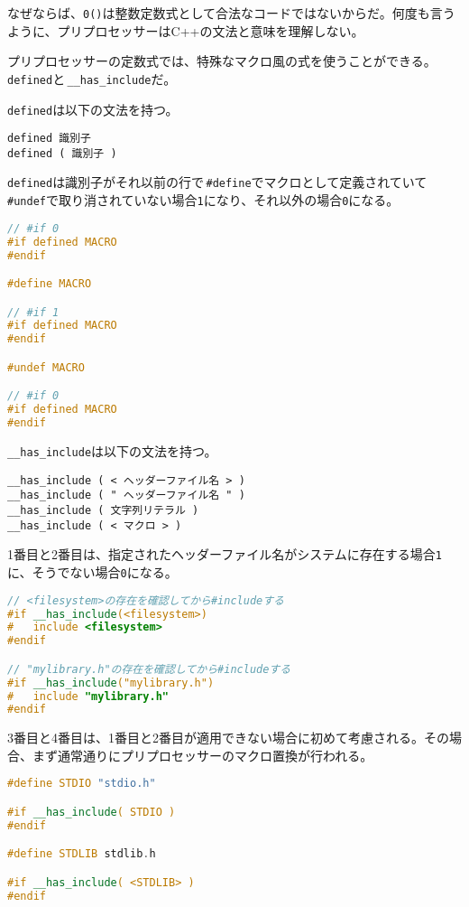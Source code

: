なぜならば、\texttt{0()}は整数定数式として合法なコードではないからだ。何度も言うように、プリプロセッサーはC++の文法と意味を理解しない。

プリプロセッサーの定数式では、特殊なマクロ風の式を使うことができる。\texttt{defined}と\,\texttt{\_\_has\_include}だ。

\texttt{defined}は以下の文法を持つ。

\begin{lstlisting}[style=grammar]
defined 識別子
defined ( 識別子 )
\end{lstlisting}

\texttt{defined}は識別子がそれ以前の行で\,\texttt{\#define}でマクロとして定義されていて\,\texttt{\#undef}で取り消されていない場合\texttt{1}になり、それ以外の場合\texttt{0}になる。

\begin{lstlisting}[language={C++}]
// #if 0
#if defined MACRO
#endif

#define MACRO

// #if 1
#if defined MACRO
#endif

#undef MACRO

// #if 0
#if defined MACRO
#endif
\end{lstlisting}

\texttt{\_\_has\_include}は以下の文法を持つ。

\begin{lstlisting}[style=grammar]
__has_include ( < ヘッダーファイル名 > )
__has_include ( " ヘッダーファイル名 " )
__has_include ( 文字列リテラル )
__has_include ( < マクロ > )
\end{lstlisting}

1番目と2番目は、指定されたヘッダーファイル名がシステムに存在する場合\texttt{1}に、そうでない場合\texttt{0}になる。

\ifTombow\pagebreak\fi
\begin{lstlisting}[language={C++}]
// <filesystem>の存在を確認してから#includeする
#if __has_include(<filesystem>)
#   include <filesystem>
#endif

// "mylibrary.h"の存在を確認してから#includeする
#if __has_include("mylibrary.h")
#   include "mylibrary.h"
#endif
\end{lstlisting}

3番目と4番目は、1番目と2番目が適用できない場合に初めて考慮される。その場合、まず通常通りにプリプロセッサーのマクロ置換が行われる。

\begin{lstlisting}[language={C++}]
#define STDIO "stdio.h"

#if __has_include( STDIO )
#endif

#define STDLIB stdlib.h

#if __has_include( <STDLIB> )
#endif
\end{lstlisting}

